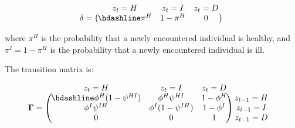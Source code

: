 \documentclass[
  12pt,
]{krantz}
\begin{document}
\[\begin{matrix}
& \\
\mathbf{\delta} =
    \left ( \vphantom{ \begin{matrix} 12 \end{matrix} } \right .
\end{matrix}
\hspace{-1.2em}
\begin{matrix}
    z_t=H & z_t=I & z_t=D \\ \hdashline
\pi^H & 1 - \pi^{H} & 0\\
\end{matrix}
\hspace{-0.2em}
\begin{matrix}
& \\
\left . \vphantom{ \begin{matrix} 12 \end{matrix} } \right )
    \begin{matrix}
    \end{matrix}
\end{matrix}\]

where \(\pi^H\) is the probability that a newly encountered individual is healthy, and \(\pi^{I} = 1 - \pi^H\) is the probability that a newly encountered individual is ill.

The transition matrix is:

\[\begin{matrix}
& \\
\mathbf{\Gamma} =
    \left ( \vphantom{ \begin{matrix} 12 \\ 12 \\ 12 \end{matrix} } \right .
\end{matrix}
\hspace{-1.2em}
\begin{matrix}
    z_t=H & z_t=I & z_t=D \\ \hdashline
\phi^H (1-\psi^{HI}) & \phi^H \psi^{HI} & 1 - \phi^H\\
\phi^{I} \psi^{IH} & \phi^{I} (1-\psi^{IH}) & 1 - \phi^{I}\\
0 & 0 & 1
\end{matrix}
\hspace{-0.2em}
\begin{matrix}
& \\
\left . \vphantom{ \begin{matrix} 12 \\ 12 \\ 12 \end{matrix} } \right )
    \begin{matrix}
    z_{t-1}=H \\ z_{t-1}=I \\ z_{t-1}=D
    \end{matrix}
\end{matrix}\]
\end{document}
